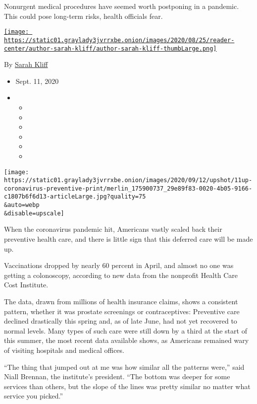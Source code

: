 Nonurgent medical procedures have seemed worth postponing in a pandemic.
This could pose long-term risks, health officials fear.

\href{https://www.nytimes3xbfgragh.onion/by/sarah-kliff}{\texttt{[image: https://static01.graylady3jvrrxbe.onion/images/2020/08/25/reader-center/author-sarah-kliff/author-sarah-kliff-thumbLarge.png]}}

By \href{https://www.nytimes3xbfgragh.onion/by/sarah-kliff}{Sarah Kliff}

\begin{itemize}
\item
  Sept. 11, 2020
\item
  \begin{itemize}
  \item
  \item
  \item
  \item
  \item
  \item
  \end{itemize}
\end{itemize}

\texttt{[image: https://static01.graylady3jvrrxbe.onion/images/2020/09/12/upshot/11up-coronavirus-preventive-print/merlin\_175900737\_29e89f83-0020-4b05-9166-c1807b6f6d13-articleLarge.jpg?quality=75\\\&auto=webp\\\&disable=upscale]}

When the coronavirus pandemic hit, Americans vastly scaled back their
preventive health care, and there is little sign that this deferred care
will be made up.

Vaccinations dropped by nearly 60 percent in April, and almost no one
was getting a colonoscopy, according to new data from the nonprofit
Health Care Cost Institute.

The data, drawn from millions of health insurance claims, shows a
consistent pattern, whether it was prostate screenings or
contraceptives: Preventive care declined drastically this spring and, as
of late June, had not yet recovered to normal levels. Many types of such
care were still down by a third at the start of this summer, the most
recent data available shows, as Americans remained wary of visiting
hospitals and medical offices.

``The thing that jumped out at me was how similar all the patterns
were,'' said Niall Brennan, the institute's president. ``The bottom was
deeper for some services than others, but the slope of the lines was
pretty similar no matter what service you picked.''

